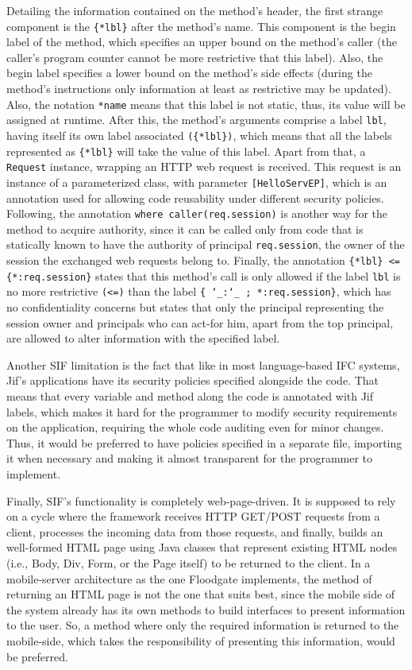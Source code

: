 Detailing the information contained on the method's header, the first strange component is the \texttt{\{*lbl\}} after the method's name. This component is the begin label of the method, which specifies an upper bound on the method's caller (the caller's program counter cannot be more restrictive that this label). Also, the begin label specifies a lower bound on the method's side effects (during the method's instructions only information at least as restrictive may be updated). Also, the notation \texttt{*name} means that this label is not static, thus, its value will be assigned at runtime. After this, the method's arguments comprise a label \texttt{lbl}, having itself its own label associated \texttt{(\{*lbl\})}, which means that all the labels represented as \texttt{\{*lbl\}} will take the value of this label. Apart from that, a \texttt{Request} instance, wrapping an HTTP web request is received. This request is an instance of a parameterized class, with parameter \texttt{[HelloServEP]}, which is an annotation used for allowing code reusability under different security policies. Following, the annotation \texttt{where caller(req.session)} is another way for the method to acquire authority, since it can be called only from code that is statically known to have the authority of principal \texttt{req.session}, the owner of the session the exchanged web requests belong to.
	Finally, the annotation \texttt{\{*lbl\} <= \{*:req.session\}} states that this method's call is only allowed if the label \texttt{lbl} is no more restrictive \texttt{(<=)} than the label \texttt{\{ \char`_:\char`_ ; *:req.session\}}, which has no confidentiality concerns but states that only the principal representing the session owner and principals who can act-for him, apart from the top principal, are allowed to alter information with the specified label.
	
Another SIF limitation is the fact that like in most language-based IFC systems, Jif's applications have its security policies specified alongside the code. That means that every variable and method along the code is annotated with Jif labels, which makes it hard for the programmer to modify security requirements on the application, requiring the whole code auditing even for minor changes. Thus, it would be preferred to have policies specified in a separate file, importing it when necessary and making it almost transparent for the programmer to implement.

Finally, SIF's functionality is completely web-page-driven. It is supposed to rely on a cycle where the framework receives HTTP GET/POST requests from a client, processes the incoming data from those requests, and finally, builds an well-formed HTML page using Java classes that represent existing HTML nodes (i.e., Body, Div, Form, or the Page itself) to be returned to the client. In a mobile-server architecture as the one Floodgate implements, the method of returning an HTML page is not the one that suits best, since the mobile side of the system already has its own methods to build interfaces to present information to the user. So, a method where only the required information is returned to the mobile-side, which takes the responsibility of presenting this information, would be preferred.

